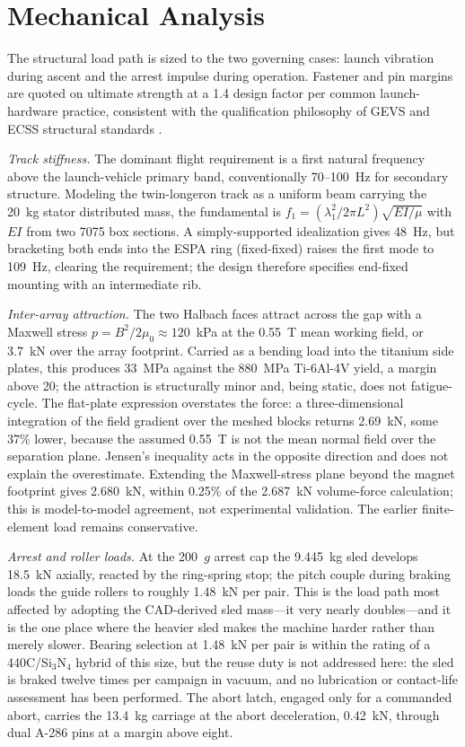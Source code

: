 \documentclass[conference]{IEEEtran}
\begin{document}
\section{Mechanical Analysis}\label{sec:mech}
The structural load path is sized to the two governing cases: launch vibration during ascent and the arrest impulse during operation. Fastener and pin margins are quoted on ultimate strength at a 1.4 design factor per common launch-hardware practice, consistent with the qualification philosophy of GEVS \cite{gevs} and ECSS structural standards \cite{ecss}.

\emph{Track stiffness.} The dominant flight requirement is a first natural frequency above the launch-vehicle primary band, conventionally 70--100~Hz for secondary structure. Modeling the twin-longeron track as a uniform beam carrying the 20~kg stator distributed mass, the fundamental is $f_1=(\lambda_1^2/2\pi L^2)\sqrt{EI/\mu}$ with $EI$ from two 7075 box sections. A simply-supported idealization gives 48~Hz, but bracketing both ends into the ESPA ring (fixed-fixed) raises the first mode to 109~Hz, clearing the requirement; the design therefore specifies end-fixed mounting with an intermediate rib.

\emph{Inter-array attraction.} The two Halbach faces attract across the gap with a Maxwell stress $p=B^2/2\mu_0\approx120$~kPa at the 0.55~T mean working field, or 3.7~kN over the array footprint. Carried as a bending load into the titanium side plates, this produces 33~MPa against the 880~MPa Ti-6Al-4V yield, a margin above 20; the attraction is structurally minor and, being static, does not fatigue-cycle. The flat-plate expression overstates the force: a three-dimensional integration of the field gradient over the meshed blocks returns 2.69~kN, some 37\% lower, because the assumed 0.55~T is not the mean normal field over the separation plane. Jensen's inequality acts in the opposite direction and does not explain the overestimate. Extending the Maxwell-stress plane beyond the magnet footprint gives 2.680~kN, within 0.25\% of the 2.687~kN volume-force calculation; this is model-to-model agreement, not experimental validation. The earlier finite-element load remains conservative.

\emph{Arrest and roller loads.} At the 200~$g$ arrest cap the 9.445~kg sled develops 18.5~kN axially, reacted by the ring-spring stop; the pitch couple during braking loads the guide rollers to roughly 1.48~kN per pair. This is the load path most affected by adopting the CAD-derived sled mass---it very nearly doubles---and it is the one place where the heavier sled makes the machine harder rather than merely slower. Bearing selection at 1.48~kN per pair is within the rating of a 440C/Si$_3$N$_4$ hybrid of this size, but the reuse duty is not addressed here: the sled is braked twelve times per campaign in vacuum, and no lubrication or contact-life assessment has been performed. The abort latch, engaged only for a commanded abort, carries the 13.4~kg carriage at the abort deceleration, 0.42~kN, through dual A-286 pins at a margin above eight.
\end{document}
